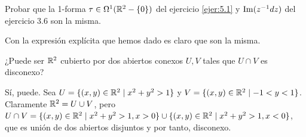 \documentclass[twoside]{article}
\begin{document}
\newpage

\begin{ejercicio}{5.2}
Probar que la 1-forma $\tau\in\Omega^1(\mathbb{R}^2-\{0\})$ del ejercicio \ref{ejer:5.1} y $\operatorname{Im}(z^{-1}dz)$ del ejercicio 3.6 son la misma. %
\end{ejercicio}
\begin{solucion}

Con la expresión explícita que hemos dado es claro que son la misma.

\end{solucion}
\newpage

\begin{ejercicio}{5.3}
¿Puede ser $\mathbb{R}^2$ cubierto por dos abiertos conexos $U,V$ tales que $U\cap V$ es disconexo? 
\end{ejercicio}
\begin{solucion}
Sí, puede. Sea $U=\{(x,y)\in\mathbb{R}^2\mid x^2+y^2>1\}$ y $V=\{(x,y)\in\mathbb{R}^2\mid -1<y<1\}$. Claramente $\mathbb{R}^2=U\cup V$, pero $U\cap V=\{(x,y)\in\mathbb{R}^2\mid x^2+y^2>1, x>0\}\cup \{(x,y)\in\mathbb{R}^2\mid x^2+y^2>1, x<0\}$, que es unión de dos abiertos disjuntos y por tanto, disconexo. 
\end{solucion}
\newpage
\end{document}
